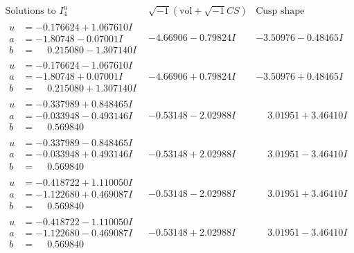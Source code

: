 \documentclass[1p]{elsarticle_modified}
\theoremstyle{definition}
\newcommand{\I}{\sqrt{-1}}
\begin{document}
$$\begin{array}{c|c|c}  
\text{Solutions to }I^u_{4}& \I (\text{vol} + \sqrt{-1}CS) & \text{Cusp shape}\\
 \hline 
\begin{aligned}
u &= -0.176624 + 1.067610 I \\
a &= -1.80748 - 0.07001 I \\
b &= \phantom{-}0.215080 - 1.307140 I\end{aligned}
 & -4.66906 - 0.79824 I & -3.50976 - 0.48465 I \\ \hline\begin{aligned}
u &= -0.176624 - 1.067610 I \\
a &= -1.80748 + 0.07001 I \\
b &= \phantom{-}0.215080 + 1.307140 I\end{aligned}
 & -4.66906 + 0.79824 I & -3.50976 + 0.48465 I \\ \hline\begin{aligned}
u &= -0.337989 + 0.848465 I \\
a &= -0.033948 - 0.493146 I \\
b &= \phantom{-}0.569840\phantom{ +0.000000I}\end{aligned}
 & -0.53148 - 2.02988 I & \phantom{-}3.01951 + 3.46410 I \\ \hline\begin{aligned}
u &= -0.337989 - 0.848465 I \\
a &= -0.033948 + 0.493146 I \\
b &= \phantom{-}0.569840\phantom{ +0.000000I}\end{aligned}
 & -0.53148 + 2.02988 I & \phantom{-}3.01951 - 3.46410 I \\ \hline\begin{aligned}
u &= -0.418722 + 1.110050 I \\
a &= -1.122680 + 0.469087 I \\
b &= \phantom{-}0.569840\phantom{ +0.000000I}\end{aligned}
 & -0.53148 - 2.02988 I & \phantom{-}3.01951 + 3.46410 I \\ \hline\begin{aligned}
u &= -0.418722 - 1.110050 I \\
a &= -1.122680 - 0.469087 I \\
b &= \phantom{-}0.569840\phantom{ +0.000000I}\end{aligned}
 & -0.53148 + 2.02988 I & \phantom{-}3.01951 - 3.46410 I \\ \hline\begin{aligned}

\end{aligned}
\end{array}$$
\end{document}
